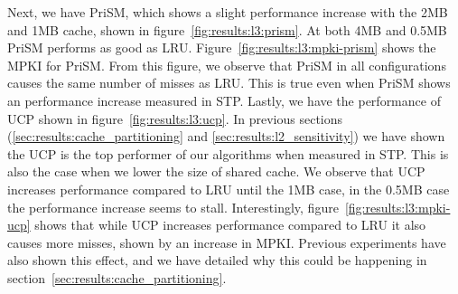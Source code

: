 Next, we have PriSM, which shows a slight performance increase with the 2MB and 1MB cache, shown in figure~\ref{fig:results:l3:prism}. 
At both 4MB and 0.5MB PriSM performs as good as LRU.
Figure~\ref{fig:results:l3:mpki-prism} shows the MPKI for PriSM.
From this figure, we observe that PriSM in all configurations causes the same number of misses as LRU.
This is true even when PriSM shows an performance increase measured in STP.
Lastly, we have the performance of UCP shown in figure~\ref{fig:results:l3:ucp}. 
In previous sections (\ref{sec:results:cache_partitioning} and \ref{sec:results:l2_sensitivity}) we have shown the UCP is the top performer of our algorithms when measured in STP.
This is also the case when we lower the size of shared cache.
We observe that UCP increases performance compared to LRU until the 1MB case, in the 0.5MB case the performance increase seems to stall.
Interestingly, figure~\ref{fig:results:l3:mpki-ucp} shows that while UCP increases performance compared to LRU it also causes more misses, shown by an increase in MPKI.
Previous experiments have also shown this effect, and we have detailed why this could be happening in section~\ref{sec:results:cache_partitioning}.

